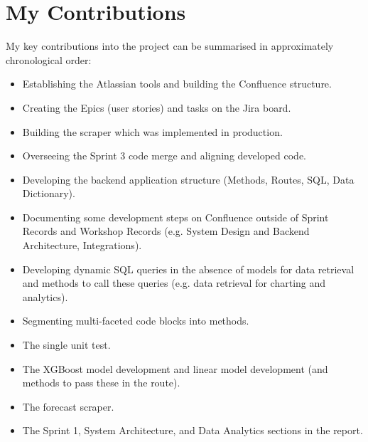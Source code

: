 \documentclass{scrreprt}
\begin{document}
\section{My Contributions}\label{Contrib}
My key contributions into the project can be summarised in approximately chronological order:
\begin{itemize}
	\item Establishing the Atlassian tools and building the Confluence structure.
	\item Creating the Epics (user stories) and tasks on the Jira board.
	\item Building the scraper which was implemented in production.
	\item Overseeing the Sprint 3 code merge and aligning developed code.
	\item Developing the backend application structure (Methods, Routes, SQL, Data Dictionary).
	\item Documenting some development steps on Confluence outside of Sprint Records and Workshop Records (e.g. System Design and Backend Architecture, Integrations).
	\item Developing dynamic SQL queries in the absence of models for data retrieval and methods to call these queries (e.g. data retrieval for charting and analytics).
	\item Segmenting multi-faceted code blocks into methods.
	\item The single unit test.
	\item The XGBoost model development and linear model development (and methods to pass these in the route).
	\item The forecast scraper.
	\item The Sprint 1, System Architecture, and Data Analytics sections in the report.
\end{itemize}
\end{document}
